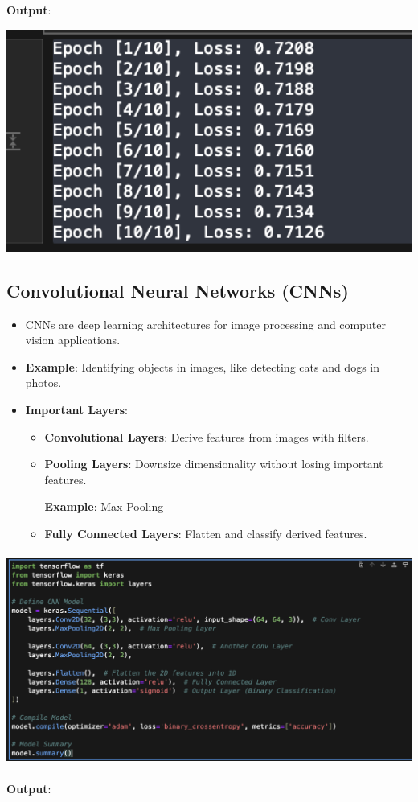\documentclass{article}
\begin{document}
\begin{itemize}
\textbf{Output}:

\includegraphics[width=14cm,height=3
cm]{PyTorch_Output.png}
\end{itemize}
\subsection{Convolutional Neural Networks (CNNs)}
\begin{itemize}
    \item CNNs are deep learning architectures for image processing and computer vision applications.
    \item \textbf{Example}: Identifying objects in images, like detecting cats and dogs in photos.
    \item \textbf{Important Layers}:
    \begin{itemize}
    \item \textbf{Convolutional Layers}: Derive features from images with filters.
    \item \textbf{Pooling Layers}: Downsize dimensionality without losing important features.
    
    \textbf{Example}: Max Pooling
    \item \textbf{Fully Connected Layers}: Flatten and classify derived features.
    \end{itemize}
\end{itemize}

\includegraphics[width=14cm,height=7cm]{CNN.png}


\textbf{Output}:
\end{document}
